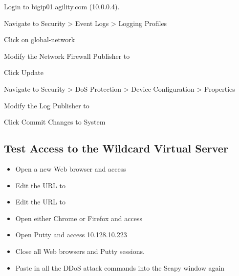 \documentclass[letterpaper,10pt,english]{sphinxmanual}
\begin{document}
Login to bigip01.agility.com (10.0.0.4).

Navigate to Security \textgreater{} Event Logs \textgreater{} Logging Profiles

Click on global-network

Modify the Network Firewall Publisher to


Click Update

Navigate to Security \textgreater{} DoS Protection \textgreater{} Device Configuration \textgreater{}
Properties

Modify the Log Publisher to 


Click Commit Changes to System


\subsection{Test Access to the Wildcard Virtual Server}
\label{\detokenize{class1/module3/lab4:test-access-to-the-wildcard-virtual-server}}\label{\detokenize{class1/module3/lab4::doc}}\begin{itemize}
\item {} 
Open a new Web browser and access
 

\item {} 
Edit the URL to 

\item {} 
Edit the URL to 

\item {} 
Open either Chrome or Firefox and access

\item {} 
Open Putty and access 10.128.10.223

\item {} 
Close all Web browsers and Putty sessions.

\item {} 
Paste in all the DDoS attack commands into the Scapy window again

\end{itemize}
\end{document}
